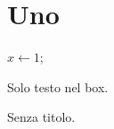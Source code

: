\documentclass{report}
\begin{document}
\chapter{Uno}
\begin{center}
\begin{minipage}{.8\textwidth}
\begin{tcolorbox}[colback=white, sharp corners, title=Il mio {\bf titolo}, boxrule=.3mm]
\begin{algorithm}[H]
\caption{Algo}
$x \leftarrow 1$;
\end{algorithm}
\end{tcolorbox}
\end{minipage}
\end{center}
\begin{tcolorbox}[title={Altro, con virgola}]
Solo testo nel box.
\end{tcolorbox}
\begin{tcolorbox}
Senza titolo.
\end{tcolorbox}
\end{document}
